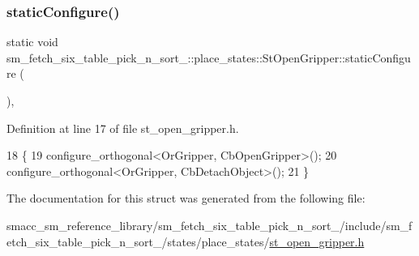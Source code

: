 \subsubsection{\texorpdfstring{static\+Configure()}{staticConfigure()}}
{\footnotesize\ttfamily static void sm\+\_\+fetch\+\_\+six\+\_\+table\+\_\+pick\+\_\+n\+\_\+sort\+\_\+::place\+\_\+states\+::\+St\+Open\+Gripper\+::static\+Configure (\begin{DoxyParamCaption}{ }\end{DoxyParamCaption})\hspace{0.3cm}{\ttfamily [inline]}, {\ttfamily [static]}}



Definition at line 17 of file st\+\_\+open\+\_\+gripper.\+h.


\begin{DoxyCode}
18             \{
19                 configure\_orthogonal<OrGripper, CbOpenGripper>();
20                 configure\_orthogonal<OrGripper, CbDetachObject>();
21             \}
\end{DoxyCode}


The documentation for this struct was generated from the following file\+:\begin{DoxyCompactItemize}
\item 
smacc\+\_\+sm\+\_\+reference\+\_\+library/sm\+\_\+fetch\+\_\+six\+\_\+table\+\_\+pick\+\_\+n\+\_\+sort\+\_/include/sm\+\_\+fetch\+\_\+six\+\_\+table\+\_\+pick\+\_\+n\+\_\+sort\+\_/states/place\+\_\+states/\hyperlink{sm__fetch__six__table__pick__n__sort__1_2include_2sm__fetch__six__table__pick__n__sort__1_2state944dfde83b284abf1c8175ccab1eb14c}{st\+\_\+open\+\_\+gripper.\+h}\end{DoxyCompactItemize}
